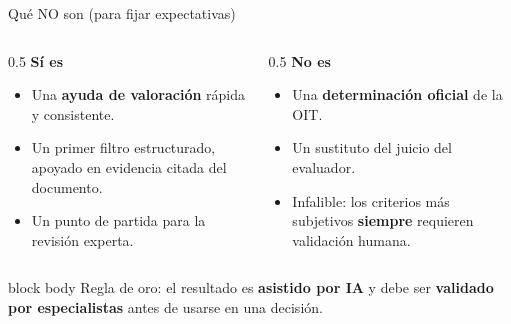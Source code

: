 \documentclass[aspectratio=169,11pt]{beamer}
\newcommand{\redlead}[1]{\textbf{\color{iloRed}#1}}
\newcommand{\bluelead}[1]{\textbf{\color{iloBlue}#1}}
\begin{document}
\begin{frame}{Qué NO son (para fijar expectativas)}
  \begin{columns}[T]
    \begin{column}{0.5\textwidth}
      \bluelead{Sí es}
      \begin{itemize}
        \item Una \textbf{ayuda de valoración} rápida y consistente.
        \item Un primer filtro estructurado, apoyado en evidencia citada del documento.
        \item Un punto de partida para la revisión experta.
      \end{itemize}
    \end{column}
    \begin{column}{0.5\textwidth}
      \redlead{No es}
      \begin{itemize}
        \item Una \textbf{determinación oficial} de la OIT.
        \item Un sustituto del juicio del evaluador.
        \item Infalible: los criterios más subjetivos \textbf{siempre} requieren validación humana.
      \end{itemize}
    \end{column}
  \end{columns}
  \vspace{0.3cm}
  \begin{beamercolorbox}[wd=\textwidth,sep=6pt]{block body}
    \centering\small Regla de oro: el resultado es \redlead{asistido por IA} y debe ser \bluelead{validado por especialistas} antes de usarse en una decisión.
  \end{beamercolorbox}
\end{frame}

\end{document}
